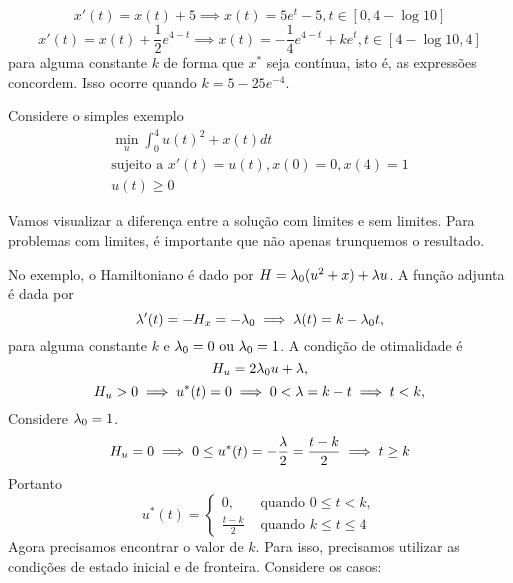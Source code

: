 $$
x'(t) = x(t) + 5 \implies x(t) = 5e^t - 5, t \in [0, 4-\log 10]
$$
$$
x'(t) = x(t) + \frac{1}{2}e^{4-t} \implies x(t) = -\frac{1}{4}e^{4-t} + ke^t, t \in [4 - \log 10, 4]
$$
para alguma constante $k$ de forma que $x^*$ seja contínua, isto é, as
expressões concordem. Isso ocorre quando $k = 5 - 25e^{-4}$. 

\begin{example}
    Considere o simples exemplo 
    \begin{gather*}
        \min_u \int_0^4 u(t)^2 + x(t) dt \\ 
        \text{sujeito a  }x'(t) = u(t), x(0) = 0, x(4) = 1 \\
        u(t) \ge 0 
    \end{gather*}
\end{example}

Vamos visualizar a diferença entre a solução com limites e sem limites. Para
problemas com limites, é importante que não apenas trunquemos o resultado. 

No exemplo, o Hamiltoniano é dado por $H = \lambda_0(u^2 + x) + \lambda u$. A função adjunta
é dada por 
$$\lambda '(t) = - H_x = -\lambda_0 \implies \lambda(t) = k - \lambda_0 t, 
$$
para alguma constante $k$ e $\lambda_0 = 0 \text{ ou } \lambda_0 = 1$. 
A condição de otimalidade é 
$$
H_u = 2\lambda_0 u + \lambda, 
$$
$$
H_u > 0 \implies u^*(t) = 0 \implies 0 < \lambda = k - t \implies t < k,
$$
Considere $\lambda_0 = 1$.
$$
H_u = 0 \implies 0 \le u^*(t) = -\frac{\lambda}{2} = \frac{t-k}{2} \implies t \ge k
$$
Portanto 
$$
u^*(t) = \begin{cases}
    0, &\text{ quando } 0 \le t < k, \\ 
    \frac{t-k}{2} &\text{ quando } k \le t \le 4
\end{cases}
$$
Agora precisamos encontrar o valor de $k$. Para isso, precisamos utilizar as condições de estado inicial e de fronteira. Considere os casos: 

